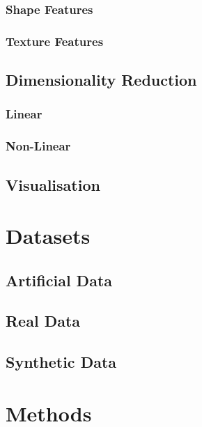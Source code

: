 \documentclass[paper=a4, fontsize=11pt]{scrartcl}	%
\numberwithin{equation}{section}															%
\numberwithin{figure}{section}																%
\numberwithin{table}{section}
\begin{document}
\subsubsection{Shape Features}

\subsubsection{Texture Features}

\subsection{Dimensionality Reduction}

\subsubsection{Linear}

\subsubsection{Non-Linear}

\subsection{Visualisation}

\section{Datasets}

\subsection{Artificial Data}

\subsection{Real Data}

\subsection{Synthetic Data}

\section{Methods}
\end{document}
